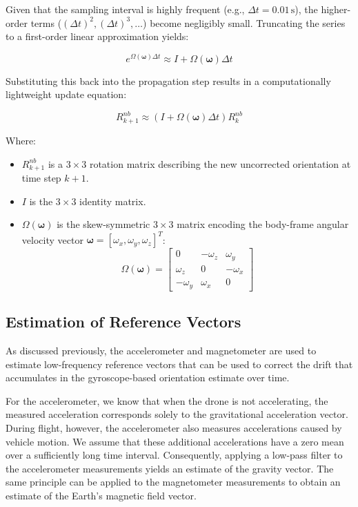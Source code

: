\documentclass{article}
\begin{document}
\noindent Given that the sampling interval is highly frequent (e.g., $\Delta t = 0.01\,\mathrm{s}$), the higher-order terms ($(\Delta t)^2, (\Delta t)^3, \dots$) become negligibly small. Truncating the series to a first-order linear approximation yields:

\[
e^{\Omega(\boldsymbol{\omega})\Delta t} \approx I + \Omega(\boldsymbol{\omega})\Delta t
\]

\noindent Substituting this back into the propagation step results in a computationally lightweight update equation:

\[
R_{k+1}^{nb} \approx \left(I + \Omega(\boldsymbol{\omega})\Delta t\right) R_{k}^{nb}
\]

\noindent Where:
\begin{itemize}
	\item $R_{k+1}^{nb}$ is a $3\times3$ rotation matrix describing the new uncorrected orientation at time step $k+1$.
	\item $I$ is the $3\times3$ identity matrix.
	\item $\Omega(\boldsymbol{\omega})$ is the skew-symmetric $3\times3$ matrix encoding the body-frame angular velocity vector $\boldsymbol{\omega} = [\omega_x, \omega_y, \omega_z]^T$:
	\[
	\Omega(\boldsymbol{\omega}) = \begin{bmatrix} 
		0 & -\omega_z & \omega_y \\ 
		\omega_z & 0 & -\omega_x \\ 
		-\omega_y & \omega_x & 0 
	\end{bmatrix}
	\]
\end{itemize}

\subsection{Estimation of Reference Vectors}

As discussed previously, the accelerometer and magnetometer are used to estimate low-frequency reference vectors that can be used to correct the drift that accumulates in the gyroscope-based orientation estimate over time.

\vspace{1em}
\noindent For the accelerometer, we know that when the drone is not accelerating, the measured acceleration corresponds solely to the gravitational acceleration vector. During flight, however, the accelerometer also measures accelerations caused by vehicle motion. We assume that these additional accelerations have a zero mean over a sufficiently long time interval. Consequently, applying a low-pass filter to the accelerometer measurements yields an estimate of the gravity vector. The same principle can be applied to the magnetometer measurements to obtain an estimate of the Earth's magnetic field vector.
\end{document}

